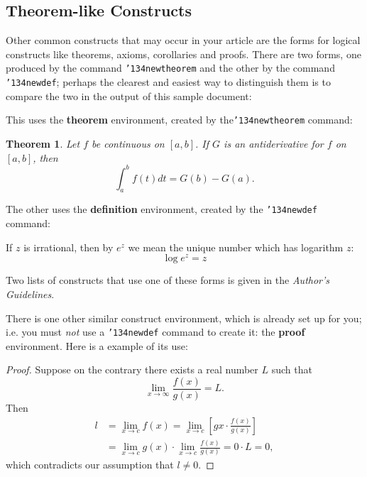 \documentclass{vldb}
\begin{document}
\subsection{Theorem-like Constructs}
Other common constructs that may occur in your article are
the forms for logical constructs like theorems, axioms,
corollaries and proofs.  There are
two forms, one produced by the
command \texttt{{\char'134}newtheorem} and the
other by the command \texttt{{\char'134}newdef}; perhaps
the clearest and easiest way to distinguish them is
to compare the two in the output of this sample document:

This uses the \textbf{theorem} environment, created by
the\linebreak\texttt{{\char'134}newtheorem} command:
\newtheorem{theorem}{Theorem}
\begin{theorem}
Let $f$ be continuous on $[a,b]$.  If $G$ is
an antiderivative for $f$ on $[a,b]$, then
\begin{displaymath}\int^b_af(t)dt = G(b) - G(a).\end{displaymath}
\end{theorem}

The other uses the \textbf{definition} environment, created
by the \texttt{{\char'134}newdef} command:
\begin{definition}
If $z$ is irrational, then by $e^z$ we mean the
unique number which has
logarithm $z$: \begin{displaymath}{\log e^z = z}\end{displaymath}
\end{definition}

Two lists of constructs that use one of these
forms is given in the
\textit{Author's  Guidelines}.


There is one other similar construct environment, which is
already set up
for you; i.e. you must \textit{not} use
a \texttt{{\char'134}newdef} command to
create it: the \textbf{proof} environment.  Here
is a example of its use:
\begin{proof}
Suppose on the contrary there exists a real number $L$ such that
\begin{displaymath}
\lim_{x\rightarrow\infty} \frac{f(x)}{g(x)} = L.
\end{displaymath}
Then
\begin{align*}
l&=\lim_{x\rightarrow c} f(x)
= \lim_{x\rightarrow c}
\left[ g{x} \cdot \frac{f(x)}{g(x)} \right ] \\
&= \lim_{x\rightarrow c} g(x) \cdot \lim_{x\rightarrow c}
\frac{f(x)}{g(x)} = 0\cdot L = 0,
\end{align*}
which contradicts our assumption that $l\neq 0$.
\end{proof}
\end{document}
